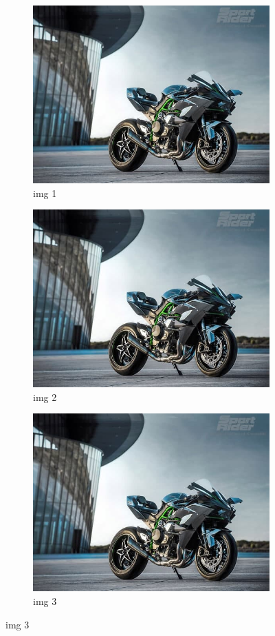 \documentclass{article}
\begin{document}
	
	\begin{figure}	
		\begin{subfigure}{0.3\linewidth}
			\centering
			\includegraphics[width=0.8\linewidth]{images/h2}
			\caption{img 1}
			\label{fig:h1}
		\end{subfigure}
		\hspace{0.2cm}
		\begin{subfigure}{0.3\linewidth}
			\centering
			\includegraphics[width=0.8\linewidth]{images/h2}
			\caption{img 2}
			\label{fig:h2}
		\end{subfigure}
		\begin{subfigure}{0.3\linewidth}
			\centering
			\includegraphics[width=0.8\linewidth]{images/h2}
			\caption{img 3}
			\label{fig:h3}
		\end{subfigure}
		

\end{figure}
\end{document}
